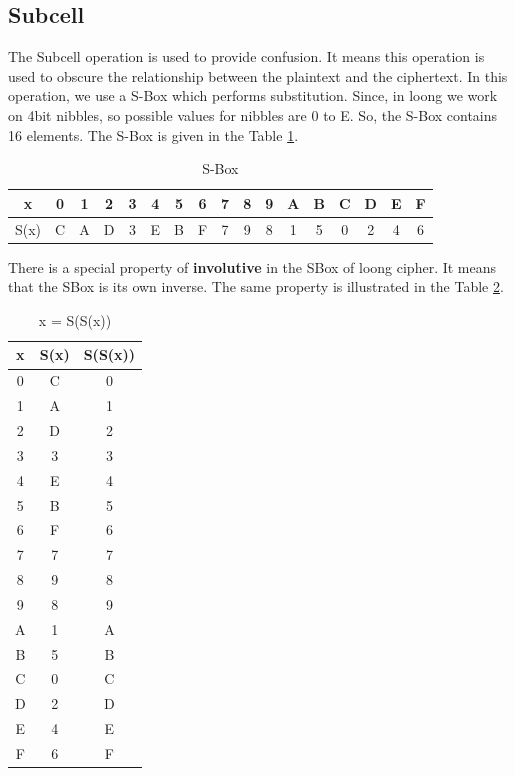 \documentclass[preprint]{transcrypto}
\begin{document}
\subsection{Subcell}
The Subcell operation is used to provide confusion. It means this operation is used to obscure the relationship between the plaintext and the ciphertext. In this operation, we use a S-Box which performs substitution. Since, in loong we work on 4bit nibbles, so possible values for nibbles are 0 to E. So, the S-Box contains 16 elements. The S-Box is given in the Table \ref{table:sbox}.
\begin{table}[H]
	\begin{center}
	\begin{tabular}{||c||c|c|c|c|c|c|c|c|c|c|c|c|c|c|c|c|}
		\hline
		x & 0 & 1 & 2 & 3 & 4 & 5 & 6 & 7 & 8 & 9 & A & B & C & D & E & F\\ 
		\hline
		S(x) & C & A & D & 3 & E & B & F & 7 & 9 & 8 & 1 & 5 & 0 & 2 & 4 &6\\
		\hline
	\end{tabular}
	\end{center}
	\caption{S-Box}
	\label{table:sbox}
\end{table}
There is a special property of \textbf{involutive} in the SBox of loong cipher. It means that the SBox is its own inverse. The same property is illustrated in the Table \ref{table:involutive}.
\begin{table}[H]
	\begin{center}
	\begin{tabular}{||c||c||c||}
		\hline
		x & S(x) & S(S(x)) \\ 
		\hline
		0 & C & 0 \\
		\hline
		1 & A & 1\\
		\hline
		2 & D & 2\\
		\hline
		3 & 3 & 3\\
		\hline
		4 & E & 4\\
		\hline
		5 & B & 5\\
		\hline
		6 & F & 6\\
		\hline
		7 & 7 & 7\\
		\hline
		8 & 9 & 8\\
		\hline
		9 & 8 & 9\\
		\hline
		A & 1 & A\\
		\hline
		B & 5 & B\\
		\hline
		C & 0 & C\\
		\hline
		D & 2 & D\\
		\hline
		E & 4 & E\\
		\hline
		F & 6 & F\\
		\hline
	\end{tabular}
	\end{center}
	\caption{x = S(S(x))}
	\label{table:involutive}
\end{table}
\end{document}
